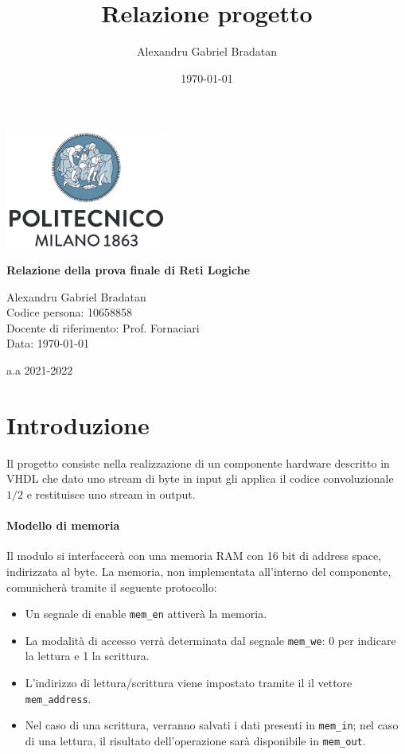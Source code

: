 \documentclass[a4paper,11pt]{article}
\title{Relazione progetto}
\author{Alexandru Gabriel Bradatan}
\date{\today}
\begin{document}
\begin{titlepage}
    \begin{center}
        \includegraphics[width=0.4\textwidth]{img/polimi-logo.png}

        \vspace*{3cm}

        \Huge
        \textbf{Relazione della prova finale di Reti Logiche}

        \vspace{1cm}

        \Large
        Alexandru Gabriel Bradatan \\
        \large
        Codice persona: 10658858 \\
        Docente di riferimento: Prof. Fornaciari \\
        Data: \today

        \vfill

        \normalsize
        a.a 2021-2022
    \end{center}
\end{titlepage}

\tableofcontents

\section{Introduzione}

Il progetto consiste nella realizzazione di un componente hardware descritto in
VHDL che dato uno stream di byte in input gli applica il codice convoluzionale
$1/2$ e restituisce uno stream in output.

\paragraph{Modello di memoria}
Il modulo si interfaccerà con una memoria RAM con 16 bit di address space,
indirizzata al byte. La memoria, non implementata all'interno del componente,
comunicherà tramite il seguente protocollo:

\begin{itemize}
  \item Un segnale di enable \texttt{mem\_en} attiverà la memoria.
  \item La modalità di accesso verrà determinata dal segnale \texttt{mem\_we}: 0
    per indicare la lettura e 1 la scrittura.
  \item L'indirizzo di lettura/scrittura viene impostato tramite il il vettore
    \texttt{mem\_address}.
  \item Nel caso di una scrittura, verranno salvati i dati presenti  in
    \texttt{mem\_in}; nel caso di una lettura, il risultato dell'operazione sarà
    disponibile in \texttt{mem\_out}.
\end{itemize}
\end{document}
